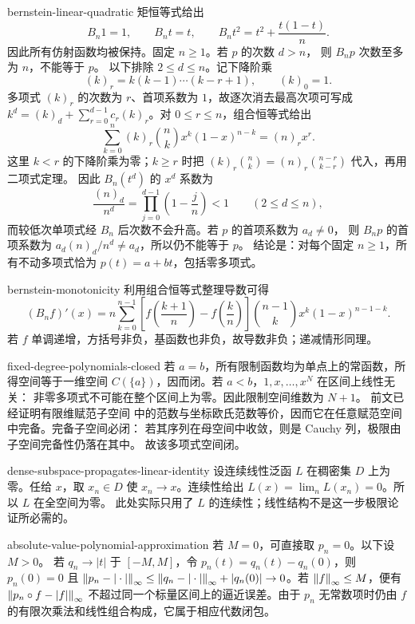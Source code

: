 \begin{solution}{bernstein-linear-quadratic}
矩恒等式给出
\[
 B_n1=1,\qquad B_nt=t,
 \qquad B_nt^2=t^2+\frac{t(1-t)}n.
\]
因此所有仿射函数均被保持。固定 $n\ge1$。若 $p$ 的次数 $d>n$，
则 $B_np$ 次数至多为 $n$，不能等于 $p$。
以下排除 $2\le d\le n$。记下降阶乘
\[
 (k)_r=k(k-1)\cdots(k-r+1),\qquad (k)_0=1.
\]
多项式 $(k)_r$ 的次数为 $r$、首项系数为 $1$，故逐次消去最高次项可写成
$k^d=(k)_d+\sum_{r=0}^{d-1}c_r(k)_r$。对 $0\le r\le n$，组合恒等式给出
\[
 \sum_{k=0}^n(k)_r\binom nkx^k(1-x)^{n-k}=(n)_r x^r.
\]
这里 $k<r$ 的下降阶乘为零；$k\ge r$ 时把
$(k)_r\binom nk=(n)_r\binom{n-r}{k-r}$ 代入，再用二项式定理。
因此 $B_n(t^d)$ 的 $x^d$ 系数为
\[
 \frac{(n)_d}{n^d}=\prod_{j=0}^{d-1}\left(1-\frac jn\right)<1
 \qquad(2\le d\le n),
\]
而较低次单项式经 $B_n$ 后次数不会升高。若 $p$ 的首项系数为 $a_d\ne0$，
则 $B_np$ 的首项系数为 $a_d(n)_d/n^d\ne a_d$，所以仍不能等于 $p$。
结论是：对每个固定 $n\ge1$，所有不动多项式恰为 $p(t)=a+bt$，包括零多项式。
\end{solution}

\begin{solution}{bernstein-monotonicity}
利用组合恒等式整理导数可得
\[
 (B_nf)'(x)=n\sum_{k=0}^{n-1}
 \left[f\left(\frac{k+1}{n}\right)-f\left(\frac{k}{n}\right)\right]
 \binom{n-1}k x^k(1-x)^{n-1-k}.
\]
若 $f$ 单调递增，方括号非负，基函数也非负，故导数非负；递减情形同理。
\end{solution}

\begin{solution}{fixed-degree-polynomials-closed}
若 $a=b$，所有限制函数均为单点上的常函数，所得空间等于一维空间
$C(\{a\})$，因而闭。若 $a<b$，$1,x,\ldots,x^N$ 在区间上线性无关：
非零多项式不可能在整个区间上为零。因此限制空间维数为 $N+1$。
前文已经证明有限维赋范子空间
中的范数与坐标欧氏范数等价，因而它在任意赋范空间中完备。完备子空间必闭：
若其序列在母空间中收敛，则是 Cauchy 列，极限由子空间完备性仍落在其中。
故该多项式空间闭。
\end{solution}

\begin{solution}{dense-subspace-propagates-linear-identity}
设连续线性泛函 $L$ 在稠密集 $D$ 上为零。任给 $x$，取 $x_n\in D$ 使
$x_n\to x$。连续性给出 $L(x)=\lim_nL(x_n)=0$。所以 $L$ 在全空间为零。
此处实际只用了 $L$ 的连续性；线性结构不是这一步极限论证所必需的。
\end{solution}

\begin{solution}{absolute-value-polynomial-approximation}
若 $M=0$，可直接取 $p_n=0$。以下设 $M>0$。
若 $q_n\to|t|$ 于 $[-M,M]$，令 $p_n(t)=q_n(t)-q_n(0)$，则
$p_n(0)=0$ 且
$\left\lVert p_n-|\cdot|\right\rVert_\infty\le
\left\lVert q_n-|\cdot|\right\rVert_\infty+|q_n(0)|\to0$。若
$\left\lVert f\right\rVert_\infty\le M$，便有
$\left\lVert p_n\circ f-|f|\right\rVert_\infty$ 不超过同一个标量区间上的逼近误差。由于
$p_n$ 无常数项时仍由 $f$ 的有限次乘法和线性组合构成，它属于相应代数闭包。
\end{solution}

